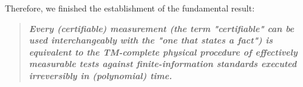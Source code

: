 \documentclass[12pt]{article}
\theoremstyle{definition}
\theoremstyle{plain}
\begin{document}
  Therefore, we finished the establishment of the fundamental result: 
  
  \begin{quote}
      
  \textbf{\textit{Every (certifiable) measurement (the term "certifiable" can be used interchangeably with the "one that states a fact") is equivalent to the TM-complete physical procedure of effectively measurable tests against finite-information standards executed irreversibly in (polynomial) time.}}
    \end{quote}


\end{document}
